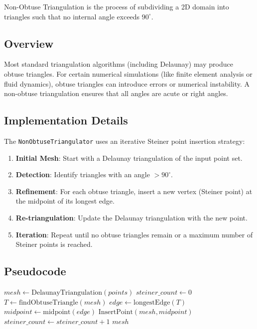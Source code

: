 Non-Obtuse Triangulation is the process of subdividing a 2D domain into triangles such that no internal angle exceeds $90^\circ$.

\subsection{Overview}

Most standard triangulation algorithms (including Delaunay) may produce obtuse triangles. For certain numerical simulations (like finite element analysis or fluid dynamics), obtuse triangles can introduce errors or numerical instability. A non-obtuse triangulation ensures that all angles are acute or right angles.

\subsection{Implementation Details}

The \texttt{NonObtuseTriangulator} uses an iterative Steiner point insertion strategy:
\begin{enumerate}
\item \textbf{Initial Mesh}: Start with a Delaunay triangulation of the input point set.
\item \textbf{Detection}: Identify triangles with an angle $> 90^\circ$.
\item \textbf{Refinement}: For each obtuse triangle, insert a new vertex (Steiner point) at the midpoint of its longest edge.
\item \textbf{Re-triangulation}: Update the Delaunay triangulation with the new point.
\item \textbf{Iteration}: Repeat until no obtuse triangles remain or a maximum number of Steiner points is reached.
\end{enumerate}

\subsection{Pseudocode}

\begin{algorithm}[htbp]
\caption{Non-Obtuse Triangulation}
\label{alg:non_obtuse}
\begin{algorithmic}[1]
  \State $mesh \gets \text{DelaunayTriangulation}(points)$
  \State $steiner\_count \gets 0$
    \State $T \gets \text{findObtuseTriangle}(mesh)$
    \State $edge \gets \text{longestEdge}(T)$
    \State $midpoint \gets \text{midpoint}(edge)$
    \State $\text{InsertPoint}(mesh, midpoint)$
    \State $steiner\_count \gets steiner\_count + 1$
  \EndWhile
  \State \Return $mesh$
\EndFunction
\end{algorithmic}
\end{algorithm}

